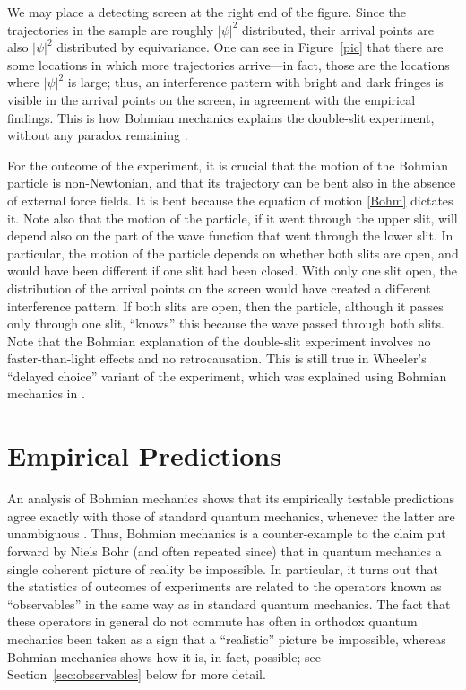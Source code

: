\documentclass[12pt]{article}
\begin{document}
We may place a detecting screen at the right end of the figure. Since the trajectories in the sample are roughly $|\psi|^2$ distributed, their arrival points are also $|\psi|^2$ distributed by equivariance. One can see in Figure~\ref{pic} that there are some locations in which more trajectories arrive---in fact, those are the locations where $|\psi|^2$ is large; thus, an interference pattern with bright and dark fringes is visible in the arrival points on the screen, in agreement with the empirical findings. This is how Bohmian mechanics explains the double-slit experiment, without any paradox remaining \cite{Bell80}.

For the outcome of the experiment, it is crucial that the motion of the Bohmian particle is non-Newtonian, and that its trajectory can be bent also in the absence of external force fields. It is bent because the equation of motion \eqref{Bohm} dictates it. Note also that the motion of the particle, if it went through the upper slit, will depend also on the part of the wave function that went through the lower slit. In particular, the motion of the particle depends on whether both slits are open, and would have been different if one slit had been closed. With only one slit open, the distribution of the arrival points on the screen would have created a different interference pattern. If both slits are open, then the particle, although it passes only through one slit, ``knows'' this because the wave passed through both slits. Note that the Bohmian explanation of the double-slit experiment involves no faster-than-light effects and no retrocausation. This is still true in Wheeler's \cite{delayedchoice} ``delayed choice'' variant of the experiment, which was explained using Bohmian mechanics in \cite{Bell80}.




\section{Empirical Predictions}
\label{sec:predictions}

An analysis of Bohmian mechanics shows that its empirically testable predictions agree exactly with those of standard quantum mechanics, whenever the latter are unambiguous \cite{Bohm52,Bell80,DGZ92}. Thus, Bohmian mechanics is a counter-example to the claim put forward by Niels Bohr \cite{Bohr} (and often repeated since) that in quantum mechanics a single coherent picture of reality be impossible. In particular, it turns out that the statistics of outcomes of experiments are related to the operators known as ``observables'' in the same way as in standard quantum mechanics. The fact that these operators in general do not commute has often in orthodox quantum mechanics been taken as a sign that a ``realistic'' picture be impossible, whereas Bohmian mechanics shows how it is, in fact, possible; see Section~\ref{sec:observables} below for more detail.
\end{document}
